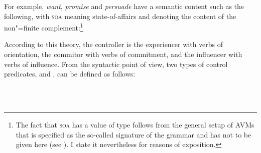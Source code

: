 For example, \emph{want}, \emph{promise} and \emph{persuade} have a semantic content such as the
following, with \textsc{soa} meaning state-of-affairs and denoting the content of the non"=finite
complement:\footnote{
  The fact that \textsc{soa} has a value of type  follows
  from the general setup of AVMs that is specified as the so-called signature of the grammar and has not to be
  given here (see ). I state it
  nevertheless for reasons of exposition.
}

\eal
\ex 
{}
\ex
\ex
\zl

According to this theory, the controller is the experiencer with verbs of orientation, the commitor
with verbs of commitment, and the influencer with verbs of influence. From the syntactic point of
view, two types of control predicates,  and , can be
defined as follows:

\eal
\label{cont}
\ex
\label{subj-contr-lx}
 \impl\\
\avm{ [ \argst  < \NPi, \ldots, [subj & < [ind & $i$ ] > ] > ]}
\ex
{} \impl\\ 
\zl

